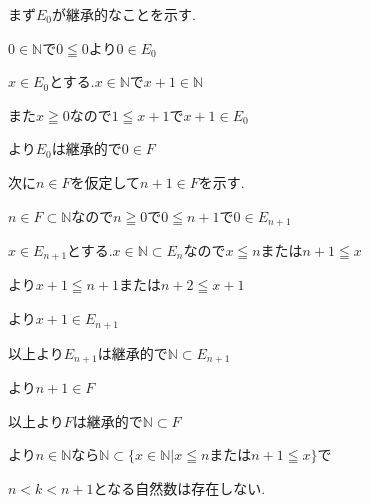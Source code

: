\documentclass{jsarticle}
\begin{document}
まず$E_0$が継承的なことを示す.

$0\in \mathbb{N}$で$0\leqq 0$より$0\in E_0$

$x\in E_0$とする.$x\in \mathbb{N}$で$x+1\in\mathbb{N}$

また$x\geqq 0$なので$1\leqq x+1$で$x+1\in E_0$

より$E_0$は継承的で$0\in F$

次に$n\in F$を仮定して$n+1\in F$を示す.

$n\in F \subset \mathbb{N}$なので$n\geqq 0$で$0\leqq n+1$で$0\in E_{n+1}$

$x\in E_{n+1}$とする.$x \in \mathbb{N} \subset E_n$なので$x\leqq n $または$n+1\leqq x$

より$x+1\leqq n+1$または$n+2\leqq x+1$

より$x+1\in E_{n+1}$

以上より$E_{n+1}$は継承的で$\mathbb{N}\subset E_{n+1}$

より$n+1\in F$

以上より$F$は継承的で$\mathbb{N}\subset F$

より$n\in \mathbb{N}$なら$\mathbb{N}\subset \{x\in \mathbb{N}|x\leqq nまたは n+1\leqq x\}$で

$n<k<n+1$となる自然数は存在しない.
\end{document}
